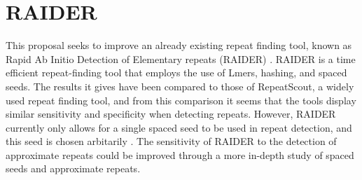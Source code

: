 \section{RAIDER}

This proposal seeks to improve an already existing repeat finding tool, known as Rapid Ab Initio Detection of Elementary repeats (RAIDER) \cite{figueroa2013raider}. RAIDER is a time efficient repeat-finding tool that employs the use of Lmers, hashing, and spaced seeds. The results it gives have been compared to those of RepeatScout, a widely used repeat finding tool, and from this comparison it seems that the tools display similar sensitivity and specificity when detecting repeats. However, RAIDER currently only allows for a single spaced seed to be used in repeat detection, and this seed is chosen arbitarily \cite{figueroa2013raiderpaper}. The sensitivity of RAIDER to the detection of approximate repeats could be improved through a more in-depth study of spaced seeds and approximate repeats.